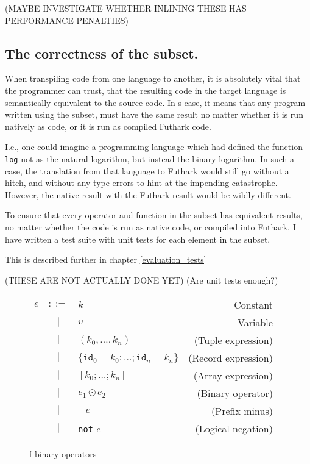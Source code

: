 (MAYBE INVESTIGATE WHETHER INLINING THESE HAS PERFORMANCE PENALTIES) 


\subsection{The correctness of the \fshark{} subset.}
When transpiling code from one language to another, it is absolutely vital that
the programmer can trust, that the resulting code in the target language is
semantically equivalent to the source code.
In \fshark{}s case, it means that any program written using the \fshark{}
subset, must have the same result no matter whether it is run natively as
\fsharp{} code, or it is run as \fshark{} compiled Futhark code.

I.e., one could imagine a programming language which had defined the function
\texttt{log} not as the natural logarithm, but instead the binary logarithm. In
such a case, the translation from that language to Futhark would still go
without a hitch, and without any type errors to hint at the impending
catastrophe.
However, the native result with the Futhark result would be wildly different.

To ensure that every operator and function in the \fshark{} subset has
equivalent results, no matter whether the \fshark{} code is run as native
\fsharp{} code, or compiled into Futhark, I have written a test suite with unit
tests for each element in the \fsharp{} subset. 

This is described further in chapter \ref{evaluation_tests}

(THESE ARE NOT ACTUALLY DONE YET)
(Are unit tests enough?)









\begin{figure}
  \centering
  \begin{tabular}{lclr}
    $e$ & $::=$ & $k$ & Constant \\
        & $|$   & $v$ & Variable \\
        & $|$   & $(k_0 , \ldots , k_n)$ & (Tuple expression) \\
        & $|$   & $\{\texttt{id}_0=k_0 ; \ldots ; \texttt{id}_n=k_n\}$ & (Record expression) \\
        & $|$   & $[k_0 ; \ldots ; k_n]$ & (Array expression) \\
        & $|$   & $e_1 \odot e_2$ & (Binary operator) \\
        & $|$   & $-e$ & (Prefix minus) \\
        & $|$   & \texttt{not} $e$ & (Logical negation) \\
  \end{tabular}
  \caption{f binary operators}
\end{figure}

